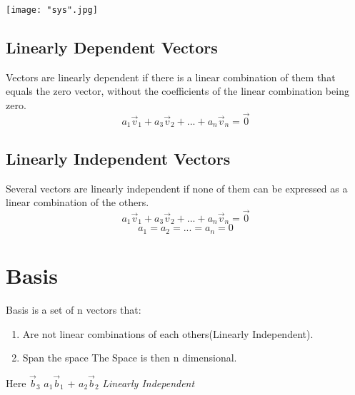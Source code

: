 \documentclass[a4paper,12pt]{article}
\begin{document}
\begin{flushleft}
\begin{flushleft}
\begin{flushleft}
\begin{center}
    \texttt{[image: "sys".jpg]}
\end{center}

\subsection{Linearly Dependent Vectors}
Vectors are linearly dependent if there is a linear combination of them that equals the zero vector, without the coefficients of the linear combination being zero.
\[ a_1\vec v_1 + a_3\vec v_2 + ... + a_n\vec v_n = \vec 0\]

\subsection{Linearly Independent Vectors}
Several vectors are linearly independent if none of them can be expressed as a linear combination of the others.
\[ a_1\vec v_1 + a_3\vec v_2 + ... + a_n\vec v_n = \vec 0\]
\[a_1 = a_2 = ... = a_n = 0\]





\end{flushleft}



\section{Basis}
\begin{flushleft}
Basis is a set of n vectors that:
\begin{enumerate}
    \item Are not linear combinations of each others(Linearly Independent).
    \item Span the space
    \newline
    The Space is then n dimensional. 
\end{enumerate}

\begin{center}
\end{center}

Here $\vec b_3$ \ne $a_1\vec b_1$ + $a_2\vec b_2$ \rightarrow \textit{Linearly Independent}
\end{flushleft}


\end{flushleft}
\end{flushleft}
\end{document}
